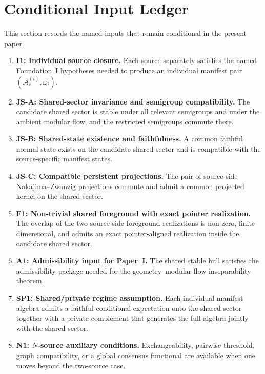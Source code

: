 \documentclass[12pt]{article}
\theoremstyle{definition}
\theoremstyle{remark}
\begin{document}
\section{Conditional Input Ledger}\label{sec:ledger}

This section records the named inputs that remain conditional in the
present paper.

\begin{enumerate}
\item \textbf{I1: Individual source closure.} Each source separately
  satisfies the named Foundation~I hypotheses needed to produce an
  individual manifest pair \((\mathcal A_c^{(i)},\omega_i)\).

\item \textbf{JS-A: Shared-sector invariance and semigroup
  compatibility.} The candidate shared sector is stable under all
  relevant semigroups and under the ambient modular flow, and the
  restricted semigroups commute there.

\item \textbf{JS-B: Shared-state existence and faithfulness.} A common
  faithful normal state exists on the candidate shared sector and is
  compatible with the source-specific manifest states.

\item \textbf{JS-C: Compatible persistent projections.} The pair of
  source-side Nakajima--Zwanzig projections commute and admit a common
  projected kernel on the shared sector.

\item \textbf{F1: Non-trivial shared foreground with exact pointer
  realization.} The overlap of the two source-side foreground
  realizations is non-zero, finite dimensional, and admits an exact
  pointer-aligned realization inside the candidate shared sector.

\item \textbf{A1: Admissibility input for Paper~I.} The shared stable
  hull satisfies the admissibility package needed for the
  geometry--modular-flow inseparability theorem.

\item \textbf{SP1: Shared/private regime assumption.} Each individual
  manifest algebra admits a faithful conditional expectation onto the
  shared sector together with a private complement that generates the
  full algebra jointly with the shared sector.

\item \textbf{N1: \(N\)-source auxiliary conditions.} Exchangeability,
  pairwise threshold, graph compatibility, or a global consensus
  functional are available when one moves beyond the two-source case.
\end{enumerate}
\end{document}
